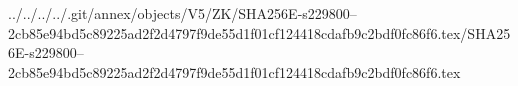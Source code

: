 ../../../../.git/annex/objects/V5/ZK/SHA256E-s229800--2cb85e94bd5c89225ad2f2d4797f9de55d1f01cf124418cdafb9c2bdf0fc86f6.tex/SHA256E-s229800--2cb85e94bd5c89225ad2f2d4797f9de55d1f01cf124418cdafb9c2bdf0fc86f6.tex